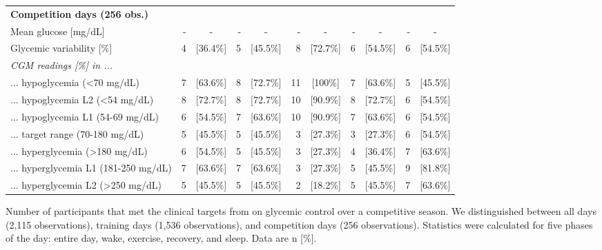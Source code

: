 \documentclass[11pt,a4paper]{article}
\begin{document}
\begin{threeparttable}
\begin{tabular}{@{}l rc rc rc rc rc@{}}
        \textbf{Competition days (256 obs.)}\\
        Mean glucose [mg/dL] & - & - & - & - & - & - & - & - & - & -\\
        Glycemic variability [\%]                         & 4 & [36.4\%] & 5 & [45.5\%] & 8 & [72.7\%] & 6 & [54.5\%] & 6 & [54.5\%]\\
        \textit{CGM readings [\%] in ...} \\
        ... hypoglycemia (<70 mg/dL)                      & 7 & [63.6\%] & 8 & [72.7\%] & 11 & [100\%] & 7 & [63.6\%] & 5 & [45.5\%]\\
        \hspace{3mm} ... hypoglycemia L2 (<54 mg/dL)      & 8 & [72.7\%] & 8 & [72.7\%] & 10 & [90.9\%] & 8 & [72.7\%] & 6 & [54.5\%]\\
        \hspace{3mm} ... hypoglycemia L1 (54-69 mg/dL)    & 6 & [54.5\%] & 7 & [63.6\%] & 10 & [90.9\%] & 7 & [63.6\%] & 6 & [54.5\%]\\
        ... target range (70-180 mg/dL)                   & 5 & [45.5\%] & 5 & [45.5\%] & 3 & [27.3\%] & 3 & [27.3\%] & 6 & [54.5\%]\\
        ... hyperglycemia (>180 mg/dL)                    & 6 & [54.5\%] & 5 & [45.5\%] & 3 & [27.3\%] & 4 & [36.4\%] & 7 & [63.6\%]\\
        \hspace{3mm} ... hyperglycemia L1 (181-250 mg/dL) & 7 & [63.6\%] & 7 & [63.6\%] & 3 & [27.3\%] & 5 & [45.5\%] & 9 & [81.8\%]\\
        \hspace{3mm} ... hyperglycemia L2 (>250 mg/dL)    & 5 & [45.5\%] & 5 & [45.5\%] & 2 & [18.2\%] & 5 & [45.5\%] & 7 & [63.6\%]\\
        \bottomrule
    \end{tabular}
\begin{tablenotes}
\item \footnotesize {Number of participants that met the clinical targets from \citet{31177185} on glycemic control over a competitive season. We distinguished between all days (2,115 observations), training days (1,536 observations), and competition days (256 observations). Statistics were calculated for five phases of the day: entire day, wake, exercise, recovery, and sleep. Data are n [\%].}
\end{tablenotes}
\end{threeparttable}
\end{document}
